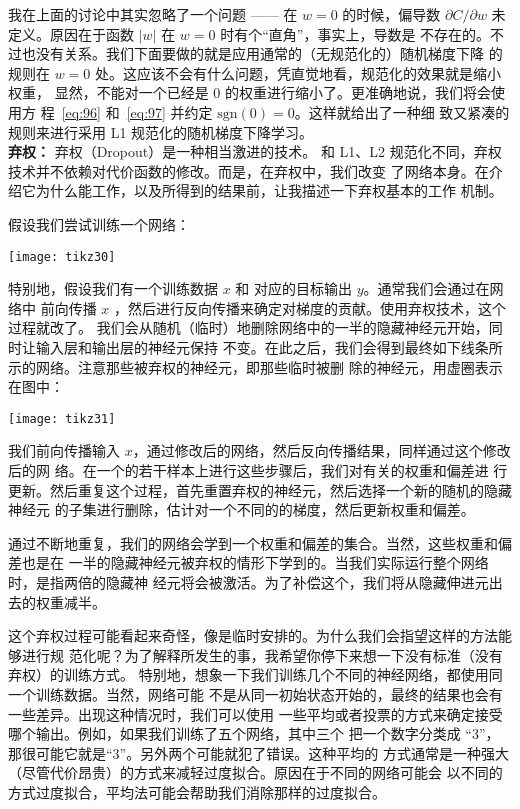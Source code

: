 我在上面的讨论中其实忽略了一个问题 —— 在 $w=0$ 的时候，偏导数 $\partial
C/\partial w$ 未定义。原因在于函数 $|w|$ 在 $w=0$ 时有个``直角''，事实上，导数是
不存在的。不过也没有关系。我们下面要做的就是应用通常的（无规范化的）随机梯度下降
的规则在 $w=0$ 处。这应该不会有什么问题，凭直觉地看，规范化的效果就是缩小权重，
显然，不能对一个已经是 $0$ 的权重进行缩小了。更准确地说，我们将会使用方
程~\eqref{eq:96} 和~\eqref{eq:97} 并约定 $\mbox{sgn}(0) = 0$。这样就给出了一种细
致又紧凑的规则来进行采用 L1 规范化的随机梯度下降学习。\\

\textbf{弃权：} 弃权（Dropout）是一种相当激进的技术。
和 L1、L2 规范化不同，弃权技术并不依赖对代价函数的修改。而是，在弃权中，我们改变
了网络本身。在介绍它为什么能工作，以及所得到的结果前，让我描述一下弃权基本的工作
机制。

假设我们尝试训练一个网络：
\begin{center}
  \texttt{[image: tikz30]}
\end{center}

特别地，假设我们有一个训练数据 $x$ 和 对应的目标输出 $y$。通常我们会通过在网络中
前向传播 $x$ ，然后进行反向传播来确定对梯度的贡献。使用弃权技术，这个过程就改了。
我们会从随机（临时）地删除网络中的一半的隐藏神经元开始，同时让输入层和输出层的神经元保持
不变。在此之后，我们会得到最终如下线条所示的网络。注意那些被弃权的神经元，即那些临时被删
除的神经元，用虚圈表示在图中：
\begin{center}
  \texttt{[image: tikz31]}
\end{center}

我们前向传播输入 $x$，通过修改后的网络，然后反向传播结果，同样通过这个修改后的网
络。在一个的若干样本上进行这些步骤后，我们对有关的权重和偏差进
行更新。然后重复这个过程，首先重置弃权的神经元，然后选择一个新的随机的隐藏神经元
的子集进行删除，估计对一个不同的\minibatch{}的梯度，然后更新权重和偏差。

通过不断地重复，我们的网络会学到一个权重和偏差的集合。当然，这些权重和偏差也是在
一半的隐藏神经元被弃权的情形下学到的。当我们实际运行整个网络时，是指两倍的隐藏神
经元将会被激活。为了补偿这个，我们将从隐藏伸进元出去的权重减半。

这个弃权过程可能看起来奇怪，像是临时安排的。为什么我们会指望这样的方法能够进行规
范化呢？为了解释所发生的事，我希望你停下来想一下没有标准（没有弃权）的训练方式。
特别地，想象一下我们训练几个不同的神经网络，都使用同一个训练数据。当然，网络可能
不是从同一初始状态开始的，最终的结果也会有一些差异。出现这种情况时，我们可以使用
一些平均或者投票的方式来确定接受哪个输出。例如，如果我们训练了五个网络，其中三个
把一个数字分类成 ``3''，那很可能它就是``3''。另外两个可能就犯了错误。这种平均的
方式通常是一种强大（尽管代价昂贵）的方式来减轻过度拟合。原因在于不同的网络可能会
以不同的方式过度拟合，平均法可能会帮助我们消除那样的过度拟合。

